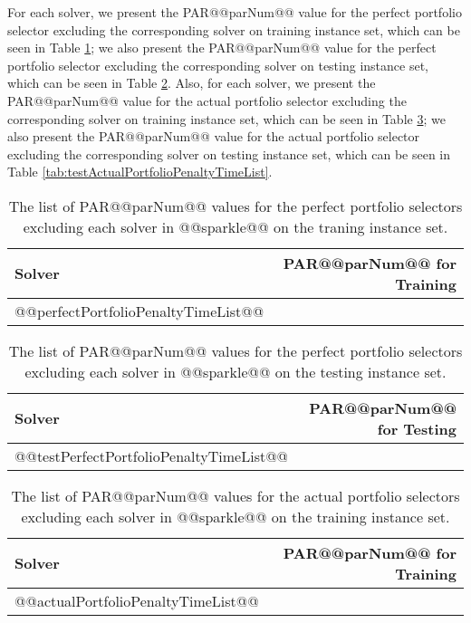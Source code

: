 \documentclass[british]{article}
\newcommand{\mytablefontsize}{9pt}
\newcommand{\mytablebaselineskip}{0.7}
\newcommand{\mytabcolsep}{5pt}
\begin{document}
For each solver, we present the PAR@@parNum@@ value for the perfect portfolio selector excluding the corresponding solver on training instance set, which can be seen in Table \ref{tab:perfectPortfolioPenaltyTimeList}; we also present the PAR@@parNum@@ value for the perfect portfolio selector excluding the corresponding solver on testing instance set, which can be seen in Table \ref{tab:testPerfectPortfolioPenaltyTimeList}. Also, for each solver, we present the PAR@@parNum@@ value for the actual portfolio selector excluding the corresponding solver on training instance set, which can be seen in Table \ref{tab:actualPortfolioPenaltyTimeList}; we also present the PAR@@parNum@@ value for the actual portfolio selector excluding the corresponding solver on testing instance set, which can be seen in Table \ref{tab:testActualPortfolioPenaltyTimeList}.

\begin{table} [t]
\center
\caption{The list of PAR@@parNum@@ values for the perfect portfolio selectors excluding each solver in @@sparkle@@ on the traning instance set.}\label{tab:perfectPortfolioPenaltyTimeList}
\fontsize{\mytablefontsize}{\mytablebaselineskip\baselineskip}\selectfont\setlength{\tabcolsep}{\mytabcolsep}
{
\begin{tabular}{lr}
\hline
Solver & PAR@@parNum@@ for Training \\
\hline
@@perfectPortfolioPenaltyTimeList@@
\hline
\end{tabular}
}
\end{table}

\begin{table} [t]
\center
\caption{The list of PAR@@parNum@@ values for the perfect portfolio selectors excluding each solver in @@sparkle@@ on the testing instance set.}\label{tab:testPerfectPortfolioPenaltyTimeList}
\fontsize{\mytablefontsize}{\mytablebaselineskip\baselineskip}\selectfont\setlength{\tabcolsep}{\mytabcolsep}
{
\begin{tabular}{lr}
\hline
Solver & PAR@@parNum@@ for Testing \\
\hline
@@testPerfectPortfolioPenaltyTimeList@@
\hline
\end{tabular}
}
\end{table}

\begin{table} [t]
\center
\caption{The list of PAR@@parNum@@ values for the actual portfolio selectors excluding each solver in @@sparkle@@ on the training instance set.}\label{tab:actualPortfolioPenaltyTimeList}
\fontsize{\mytablefontsize}{\mytablebaselineskip\baselineskip}\selectfont\setlength{\tabcolsep}{\mytabcolsep}
{
\begin{tabular}{lr}
\hline
Solver & PAR@@parNum@@ for Training \\
\hline
@@actualPortfolioPenaltyTimeList@@
\hline
\end{tabular}
}
\end{table}
\end{document}
